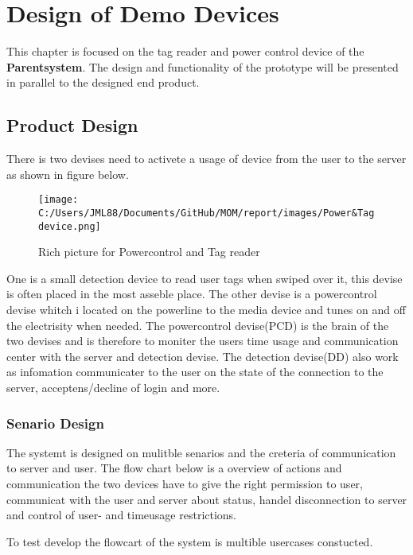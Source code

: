 \chapter{Design of Demo Devices}
This chapter is focused on the tag reader and power control device of the \textbf{Parentsystem}. 
The design and functionality of the prototype will be presented in parallel to the designed end product.

\section{Product Design}

There is two devises need to activete a usage of device from the user to the server as shown in figure below.

\begin{figure}[h]
	\centering
		\texttt{[image: C:/Users/JML88/Documents/GitHub/MOM/report/images/Power\&Tagdevice.png]}
	\caption{Rich picture for Powercontrol and Tag reader}
	\label{fig:Power&Tagdevice}
\end{figure}

One is a small detection device to read user tags when swiped over it, this devise is often placed in the most asseble place. 
The other devise is a powercontrol devise whitch i located on the powerline to the media device and tunes on and off the electrisity when needed.
The powercontrol devise(PCD) is the brain of the two devises and is therefore to moniter the users time usage and communication center with the server and detection devise. 
The detection devise(DD) also work as infomation communicater to the user on the state of the connection to the server, acceptens/decline of login and more.     

\subsection{Senario Design}

The systemt is designed on mulitble senarios and the creteria of communication to server and user. The flow chart below is a overview of actions and communication the two devices have to give the right permission to user, communicat with the user and server about status, handel disconnection to server and control of user- and timeusage restrictions.


To test develop the flowcart of the system is multible usercases constucted.


